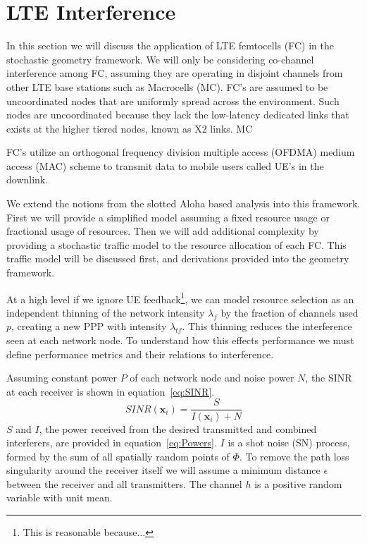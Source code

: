 \section{LTE Interference}
%
In this section we will discuss the application of LTE femtocells (FC) in the stochastic geometry framework.  We will only be considering co-channel interference among FC, assuming they are operating in disjoint channels from other LTE base stations such as Macrocells (MC).  FC's are assumed to be uncoordinated nodes that are uniformly spread across the environment.  Such nodes are uncoordinated because they lack the low-latency dedicated links that exists at the higher tiered nodes, known as X2 links.  MC
%
%
\par
%
FC's utilize an orthogonal frequency division multiple access (OFDMA) medium access (MAC) scheme to transmit data to mobile users called UE's in the downlink.
%
\par
%
We extend the notions from the slotted Aloha based analysis into this framework.  First we will provide a simplified model assuming a fixed resource usage or fractional usage of resources.  Then we will add additional complexity by providing a stochastic traffic model to the resource allocation of each FC.  This traffic model will be discussed first, and derivations provided into the geometry framework.
\par
%
At a high level if we ignore UE feedback\footnote{This is reasonable because...}, we can model resource selection as an independent thinning of the network intensity $\lambda_{f}$ by the fraction of channels used $p$, creating a new PPP with intensity $\lambda_{tf}$.  This thinning reduces the interference seen at each network node.  To understand how this effects performance we must define performance metrics and their relations to interference.\par
%
Assuming constant power $P$ of each network node and noise power $N$, the SINR at each receiver is shown in equation~\eqref{eq:SINR}.
%
\begin{equation}\label{eq:SINR}
  SINR(\textbf{x}_i) = \frac{S}{I(\textbf{x}_i) + N}
\end{equation}
%
$S$ and $I$, the power received from the desired transmitted and combined interferers, are provided in equation~\eqref{eq:Powers}.  $I$ is a shot noise (SN) process, formed by the sum of all spatially random points of $\Phi$.  To remove the path loss singularity around the receiver itself we will assume a minimum distance $\epsilon$ between the receiver and all transmitters.  The channel $h$ is a positive random variable with unit mean.
